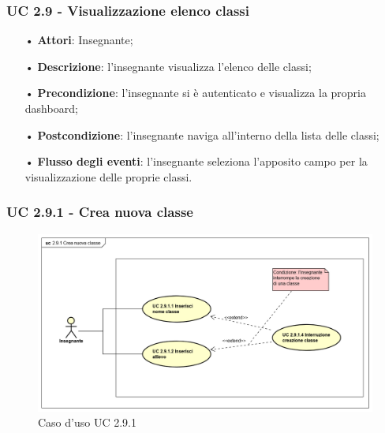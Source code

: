 \subsubsection{UC 2.9 - Visualizzazione elenco classi}
\begin{itemize}
	\item[•] \textbf{Attori}: Insegnante;
	\item[•] \textbf{Descrizione}: l'insegnante visualizza l'elenco delle classi;
	\item[•] \textbf{Precondizione}: l'insegnante si è autenticato e visualizza la propria dashboard;
	\item[•] \textbf{Postcondizione}: l'insegnante naviga all'interno della lista delle classi;
	\item[•] \textbf{Flusso degli eventi}: l'insegnante seleziona l'apposito campo per la visualizzazione delle proprie classi.
\end{itemize}

\subsubsection{UC 2.9.1 - Crea nuova classe}
\begin{figure}[H]
	\centering
	\includegraphics[width=17cm]{img/Crea_nuova_classe.png} 
	\caption{Caso d'uso UC 2.9.1}
\end{figure}

